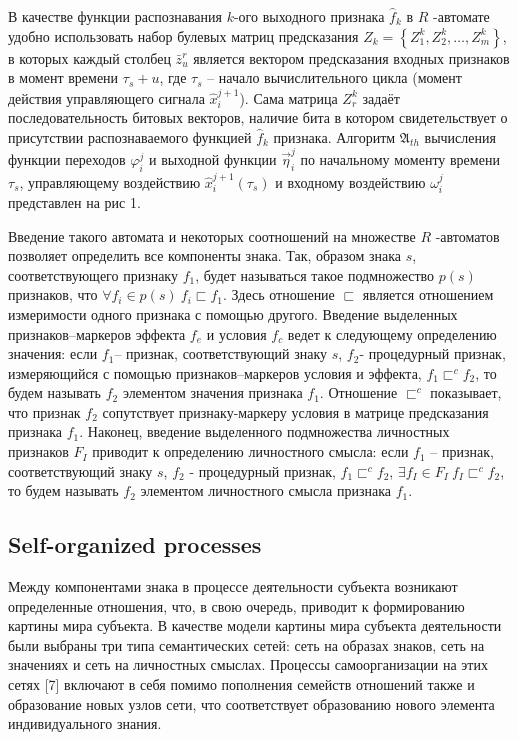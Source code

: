 \documentclass{svjour3}                     %
\begin{document}
В качестве функции распознавания $k$-ого выходного признака ${{\hat{f}}_{k}}$ в $R$ -автомате удобно использовать набор булевых матриц предсказания ${{Z}_{k}}=\left\{ Z_{1}^{k},Z_{2}^{k},\ldots ,Z_{m}^{k} \right\}$, в которых каждый столбец $\bar{z}_{u}^{r}$ является вектором предсказания входных признаков в момент времени ${{\tau }_{s}}+u$, где ${{\tau }_{s}}$ – начало вычислительного цикла (момент действия управляющего сигнала $\hat{x}_{i}^{j+1}$). Сама матрица $Z_{r}^{k}$ задаёт последовательность битовых векторов, наличие бита в котором свидетельствует о присутствии распознаваемого функцией ${{\hat{f}}_{k}}$ признака. Алгоритм ${{\mathfrak{A}}_{th}}$ вычисления функции переходов $\varphi _{i}^{j}$ и выходной функции $\vec{\eta }_{i}^{j}$ по начальному моменту времени ${{\tau }_{s}}$, управляющему воздействию $\hat{x}_{i}^{j+1}({{\tau }_{s}})$ и входному воздействию $\omega _{i}^{j}$ представлен на рис 1.

Введение такого автомата и некоторых соотношений на множестве $R$ -автоматов позволяет определить все компоненты знака. Так, образом знака $s$, соответствующего признаку ${{f}_{1}}$, будет называться такое подмножество $p(s)$ признаков, что $\forall {{f}_{i}}\in p\left( s \right)~{{f}_{i}}\sqsubset {{f}_{1}}$. Здесь отношение $\sqsubset $ является отношением измеримости одного признака с помощью другого. Введение выделенных признаков–маркеров эффекта ${{f}_{e}}$ и условия ${{f}_{c}}$ ведет к следующему определению значения: если ${{f}_{1}}$– признак, соответствующий знаку $s$, ${{f}_{2}}$- процедурный признак, измеряющийся с помощью признаков–маркеров условия и эффекта, ${{f}_{1}}{{\sqsubset }^{c}}{{f}_{2}}$, то будем называть ${{f}_{2}}$ элементом значения признака ${{f}_{1}}$. Отношение ${{\sqsubset }^{c}}$ показывает, что признак ${{f}_{2}}$ сопутствует признаку-маркеру условия в матрице предсказания признака ${{f}_{1}}$. Наконец, введение выделенного подмножества личностных признаков ${{F}_{I}}$ приводит к определению личностного смысла: если ${{f}_{1}}$ – признак, соответствующий знаку $s$, ${{f}_{2}}$ - процедурный признак, ${{f}_{1}}{{\sqsubset }^{c}}{{f}_{2}}$, $\exists {{f}_{I}}\in {{F}_{I}}~{{f}_{I}}{{\sqsubset }^{c}}{{f}_{2}}$, то будем называть ${{f}_{2}}$ элементом личностного смысла признака ${{f}_{1}}$.


\subsection{Self-organized processes}
Между компонентами знака в процессе деятельности субъекта возникают определенные отношения, что, в свою очередь, приводит к формированию картины мира субъекта. В качестве модели картины мира субъекта деятельности были выбраны три типа семантических сетей: сеть на образах знаков, сеть на значениях и сеть на личностных смыслах. Процессы самоорганизации на этих сетях [7] включают в себя помимо пополнения семейств отношений также и образование новых узлов сети, что соответствует образованию нового элемента индивидуального знания. 
\end{document}
